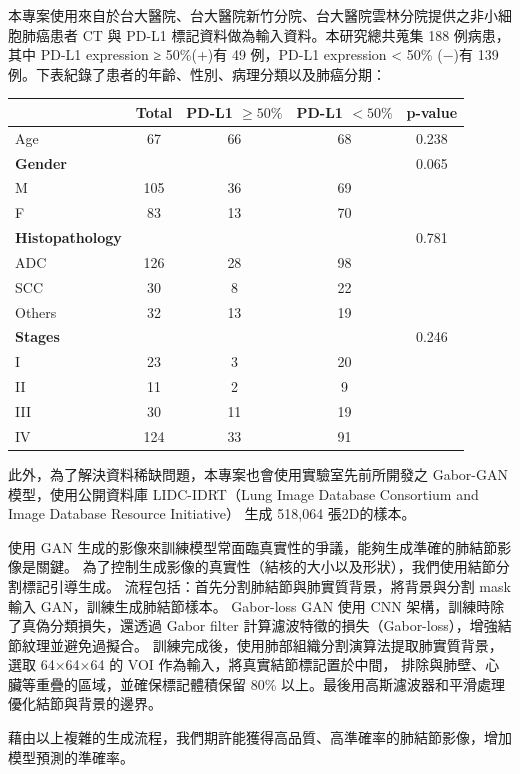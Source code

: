 \documentclass[12pt,a4paper]{article}
\begin{document}
本專案使用來自於台大醫院、台大醫院新竹分院、台大醫院雲林分院提供之非小細胞肺癌患者 CT 與 PD-L1 標記資料做為輸入資料。本研究總共蒐集 188 例病患，其中 PD-L1 expression ≥ 50\%(+)有 49 例，PD-L1 expression < 50\% (−)有 139 例。下表紀錄了患者的年齡、性別、病理分類以及肺癌分期：

\begin{table}[h]
\centering
\begin{tabular}{lcccc}
\toprule
 & Total & PD-L1 $\geq 50\%$ & PD-L1 $< 50\%$ & p-value \\
\midrule
Age & 67 & 66 & 68 & 0.238 \\
\midrule
\textbf{Gender} & & & & 0.065 \\
\quad M & 105 & 36 & 69 & \\
\quad F & 83 & 13 & 70 & \\
\midrule
\textbf{Histopathology} & & & & 0.781 \\
\quad ADC & 126 & 28 & 98 & \\
\quad SCC & 30 & 8 & 22 & \\
\quad Others & 32 & 13 & 19 & \\
\midrule
\textbf{Stages} & & & & 0.246 \\
\quad I & 23 & 3 & 20 & \\
\quad II & 11 & 2 & 9 & \\
\quad III & 30 & 11 & 19 & \\
\quad IV & 124 & 33 & 91 & \\
\bottomrule
\end{tabular}
\end{table}
\newpage
此外，為了解決資料稀缺問題，本專案也會使用實驗室先前所開發之 Gabor-GAN 模型，使用公開資料庫
LIDC-IDRT（Lung Image Database Consortium and Image Database Resource Initiative） 生成 518,064 張2D的樣本。

使用 GAN 生成的影像來訓練模型常面臨真實性的爭議，能夠生成準確的肺結節影像是關鍵。
為了控制生成影像的真實性（結核的大小以及形狀），我們使用結節分割標記引導生成。
流程包括：首先分割肺結節與肺實質背景，將背景與分割 mask 輸入 GAN，訓練生成肺結節樣本。
Gabor-loss GAN 使用 CNN 架構，訓練時除了真偽分類損失，還透過 Gabor filter 計算濾波特徵的損失（Gabor-loss），增強結節紋理並避免過擬合。
訓練完成後，使用肺部組織分割演算法提取肺實質背景，選取 64$\times$64$\times$64 的 VOI 作為輸入，將真實結節標記置於中間，
排除與肺壁、心臟等重疊的區域，並確保標記體積保留 80\% 以上。最後用高斯濾波器和平滑處理優化結節與背景的邊界。

藉由以上複雜的生成流程，我們期許能獲得高品質、高準確率的肺結節影像，增加模型預測的準確率。
\end{document}
